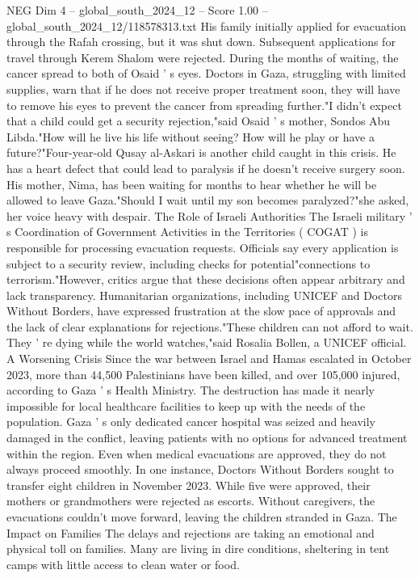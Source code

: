 \begin{textsample}{NEG Dim 4 – global\_south\_2024\_12 – Score 1.00 – global\_south\_2024\_12/118578313.txt}
His family initially applied for evacuation through the Rafah crossing, but it was shut down.
Subsequent applications for travel through Kerem Shalom were rejected.
During the months of waiting, the cancer spread to both of Osaid ' s eyes.
Doctors in Gaza, struggling with limited supplies, warn that if he does not receive proper treatment soon, they will have to remove his eyes to prevent the cancer from spreading further."I didn't expect that a child could get a security rejection,"said Osaid ' s mother, Sondos Abu Libda."How will he live his life without seeing?
How will he play or have a future?"Four-year-old Qusay al-Askari is another child caught in this crisis.
He has a heart defect that could lead to paralysis if he doesn't receive surgery soon.
His mother, Nima, has been waiting for months to hear whether he will be allowed to leave Gaza."Should I wait until my son becomes paralyzed?"she asked, her voice heavy with despair.
The Role of Israeli Authorities The Israeli military ' s Coordination of Government Activities in the Territories ( COGAT ) is responsible for processing evacuation requests.
Officials say every application is subject to a security review, including checks for potential"connections to terrorism."However, critics argue that these decisions often appear arbitrary and lack transparency.
Humanitarian organizations, including UNICEF and Doctors Without Borders, have expressed frustration at the slow pace of approvals and the lack of clear explanations for rejections."These children can not afford to wait.
They ' re dying while the world watches,"said Rosalia Bollen, a UNICEF official.
A Worsening Crisis Since the war between Israel and Hamas escalated in October 2023, more than 44,500 Palestinians have been killed, and over 105,000 injured, according to Gaza ' s Health Ministry.
The destruction has made it nearly impossible for local healthcare facilities to keep up with the needs of the population.
Gaza ' s only dedicated cancer hospital was seized and heavily damaged in the conflict, leaving patients with no options for advanced treatment within the region.
Even when medical evacuations are approved, they do not always proceed smoothly.
In one instance, Doctors Without Borders sought to transfer eight children in November 2023.
While five were approved, their mothers or grandmothers were rejected as escorts.
Without caregivers, the evacuations couldn't move forward, leaving the children stranded in Gaza.
The Impact on Families The delays and rejections are taking an emotional and physical toll on families.
Many are living in dire conditions, sheltering in tent camps with little access to clean water or food.

\end{textsample}
